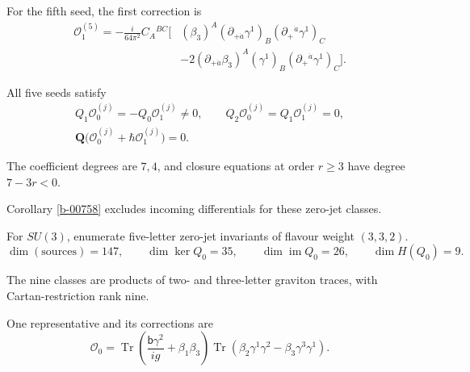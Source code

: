 \documentclass[11pt]{article}
\numberwithin{equation}{section}
\numberwithin{figure}{section}
\numberwithin{table}{section}
\begin{document}
\begin{proofbox}
For the fifth seed, the first correction is
\begin{equation}\label{eq-su2-short-correction}
\begin{aligned}
\mathcal O_1^{(5)}=-\frac{i}{64\pi^2}C_A{}^{BC}
\Big[& (\beta_3)^A(\partial_{+\dot a}\gamma^1)_B
(\partial_+{}^{\dot a}\gamma^1)_C\\
&-2(\partial_{+\dot a}\beta_3)^A(\gamma^1)_B
(\partial_+{}^{\dot a}\gamma^1)_C\Big].
\end{aligned}
\end{equation}

All five seeds satisfy
\begin{equation}\label{b-00815}
\begin{gathered}
Q_1\mathcal O_0^{(j)}=-Q_0\mathcal O_1^{(j)}\ne0,\qquad
Q_2\mathcal O_0^{(j)}=Q_1\mathcal O_1^{(j)}=0,\\
\mathbf Q\bigl(\mathcal O_0^{(j)}+\hbar\mathcal O_1^{(j)}\bigr)=0.
\end{gathered}
\end{equation}

The coefficient degrees are $7,4$, and closure equations at order $r\ge3$ have degree $7-3r<0$.

Corollary \ref{b-00758} excludes incoming differentials for these zero-jet classes.

For $SU(3)$, enumerate five-letter zero-jet invariants of flavour weight $(3,3,2)$.
\begin{equation}\label{b-00818}
\dim(\text{sources})=147,\qquad
\dim\ker Q_0=35,\qquad
\dim\operatorname{im}Q_0=26,\qquad
\dim H(Q_0)=9.
\end{equation}

The nine classes are products of two- and three-letter graviton traces, with Cartan-restriction rank nine.

One representative and its corrections are
\begin{equation}\label{eq-su3-example-source}
\mathcal O_0=\operatorname{Tr}\!\left(
\frac{\mathsf b\gamma^2}{ig}+\beta_1\beta_3\right)
\operatorname{Tr}(\beta_2\gamma^1\gamma^2-\beta_3\gamma^3\gamma^1).
\end{equation}


\end{proofbox}
\end{document}
